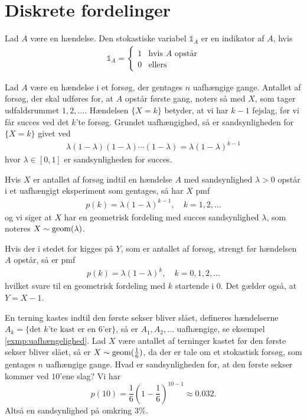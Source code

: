 \section{Diskrete fordelinger}
\begin{defn} [Indikator] %
Lad $A$ være en hændelse. Den stokastiske variabel $\mathbb{1}_A$ er en indikator af $A$, hvis
\begin{align*}
    \mathbb{1}_A=\begin{cases} 
      1 & \text{hvis } A \text{ opstår} \\
      0 & \text{ellers}
   \end{cases}
\end{align*}
\end{defn}

Lad $A$ være en hændelse i et forsøg, der gentages $n$ uafhængige gange. Antallet af forsøg, der skal udføres for, at $A$ opstår første gang, noters så med $X$, som tager udfaldsrummet $1,2,\ldots$. Hændelsen $\{X=k\}$ betyder, at vi har $k-1$ fejslag, før vi får succes ved det $k$'te forsøg. Grundet uafhængighed, så er sandsynligheden for $\{X=k\}$ givet ved
\begin{align*}
    \lambda(1-\lambda)(1-\lambda)\cdots (1-\lambda) =\lambda(1-\lambda)^{k-1}
\end{align*}
hvor $\lambda \in [0, 1]$ er sandsynligheden for succes.
\begin{defn} \label{def:2.14} %
Hvis $X$ er antallet af forsøg indtil en hændelse $A$ med sandsynlighed $\lambda>0$ opstår i et uafhængigt eksperiment som gentages, så har $X$ pmf 
\begin{align*}
    p(k)=\lambda(1-\lambda)^{k-1}, \quad k=1,2,\ldots 
\end{align*}
og vi siger at $X$ har en geometrisk fordeling med succes sandsynlighed $\lambda$, som noteres $X\sim\textnormal{geom}(\lambda)$.
\end{defn}

Hvis der i stedet for kigges på $Y$, som er antallet af forsøg, strengt før hændelsen $A$ opstår, så er pmf
\begin{align*}
    p(k)=\lambda(1-\lambda)^{k}, \quad k=0,1,2,\ldots 
\end{align*}
hvilket svare til en geometrisk fordeling med $k$ startende i $0$. Det gælder også, at $Y=X-1$.

\begin{exmp}
En terning kastes indtil den første sekser bliver slået, defineres hændelserne $A_k = \{\text{det } k \text{'te kast er en 6'er}\}$, så er $A_1, A_2, \ldots$ uafhængige, se eksempel \ref{exmp:uafhængelighed}. Lad $X$ være antallet af terninger kastet før den første sekser bliver slået, så er $X \sim \textnormal{geom}(\tfrac{1}{6})$, da der er tale om et stokastisk forsøg, som gentages $n$ uafhængige gange. Hvad er sandsynligheden for, at den første sekser kommer ved $10$'ene slag? Vi har 
\begin{equation*}
    p(10) = \frac{1}{6} \left(1-\frac{1}{6}\right)^{10 - 1} \approx 0.032.
\end{equation*}
Altså en sandsynlighed på omkring 3\%.
\end{exmp}


